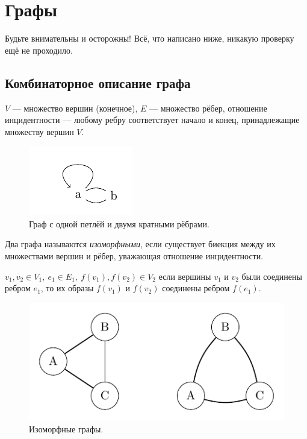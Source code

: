 \newpage
\section{Графы}
Будьте внимательны и осторожны! Всё, что написано ниже, никакую проверку ещё не проходило.
\subsection{Комбинаторное описание графа}
\begin{definition}
    $V$ — множество вершин (конечное), $E$ — множество рёбер, отношение инцидентности — любому ребру соответствует начало и конец, принадлежащие множеству вершин $V$.
\end{definition}

\begin{figure}[h]
    \centering
    \includegraphics[scale=2]{images/3.pdf}
    \caption{Граф с одной петлёй и двумя кратными рёбрами.}
    \label{fig:1}
\end{figure}

\begin{definition}
    Два графа называются \textit{изоморфными}, если существует биекция между их множествами вершин и рёбер, уважающая отношение инцидентности.
\end{definition}

$v_1, v_2 \in V_1, \ e_1 \in E_1, \ f(v_1), f(v_2) \in V_2$ если вершины $v_1$ и $v_2$ были соединены ребром $e_1$, то их образы $f(v_1)$ и $f(v_2)$ соединены ребром $f(e_1)$.

\begin{figure}[h]
    \centering
    \includegraphics{images/4.pdf}
    \caption{Изоморфные графы.}
    \label{fig:2}
\end{figure}


